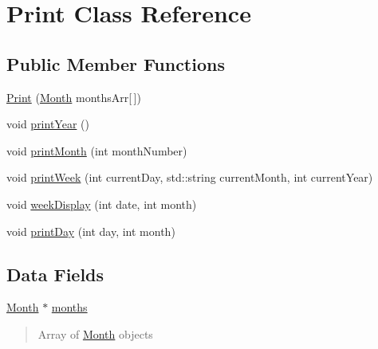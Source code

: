\hypertarget{classPrint}{\section{Print Class Reference}
\label{classPrint}
}
\subsection*{Public Member Functions}
\begin{DoxyCompactItemize}
\item 
\hyperlink{classPrint_a7b9e4716438a4d6003fb53d740172463}{Print} (\hyperlink{classMonth}{Month} months\-Arr\mbox{[}$\,$\mbox{]})
\item 
void \hyperlink{classPrint_ab38ff940d0abba39ec72485ba3e16259}{print\-Year} ()
\item 
void \hyperlink{classPrint_a783042d8e22a1b8a0b81bbcbc9bb03f0}{print\-Month} (int month\-Number)
\item 
void \hyperlink{classPrint_a5480160313e90ae75d51255bd20a54fe}{print\-Week} (int current\-Day, std\-::string current\-Month, int current\-Year)
\item 
void \hyperlink{classPrint_a7013b300e4a36e6cd2fa8c68eab71892}{week\-Display} (int date, int month)
\item 
void \hyperlink{classPrint_adcc0b985904ceb75634e3bb0b156d033}{print\-Day} (int day, int month)
\end{DoxyCompactItemize}
\subsection*{Data Fields}
\begin{DoxyCompactItemize}
\item 
\hypertarget{classPrint_a9c8bb58b547f6ffd71b735b6bb0072b1}{\hyperlink{classMonth}{Month} $\ast$ \hyperlink{classPrint_a9c8bb58b547f6ffd71b735b6bb0072b1}{months}}\label{classPrint_a9c8bb58b547f6ffd71b735b6bb0072b1}

\begin{DoxyCompactList}\small\item\em \begin{quotation}
Array of \hyperlink{classMonth}{Month} objects \end{quotation}
\end{DoxyCompactList}\end{DoxyCompactItemize}


